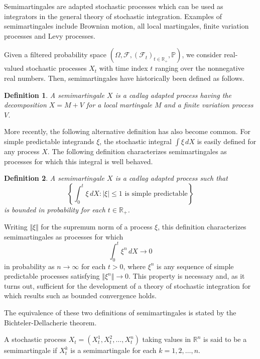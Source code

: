 \documentclass[12pt]{article}
\newtheorem*{definition*}{Definition}
\begin{document}
Semimartingales are adapted stochastic processes which can be used as integrators in the general theory of stochastic integration. Examples of semimartingales include Brownian motion, all local martingales, finite variation processes and Levy processes.

Given a filtered probability space $(\Omega,\mathcal{F},(\mathcal{F}_t)_{t\in\mathbb{R}_+},\mathbb{P})$, we consider real-valued stochastic processes $X_t$ with time index $t$ ranging over the nonnegative real numbers.
Then, semimartingales have historically been defined as follows.

\begin{definition*}
A semimartingale $X$ is a cadlag adapted process having the decomposition $X=M+V$ for a local martingale $M$ and a finite variation process $V$.
\end{definition*}

More recently, the following alternative definition has also become common.
For simple predictable integrands $\xi$, the stochastic integral $\int\xi\,dX$ is easily defined for any process $X$. The following definition characterizes semimartingales as processes for which this integral is well behaved.

\begin{definition*}
A semimartingale $X$ is a cadlag adapted process such that
\begin{equation*}
\left\{\int_0^t\xi\,dX:|\xi|\le 1\textrm{ is simple predictable}\right\}
\end{equation*}
is bounded in probability for each $t\in\mathbb{R}_+$.
\end{definition*}

Writing $\Vert\xi\Vert$ for the supremum norm of a process $\xi$, this definition characterizes semimartingales as processes for which
\begin{equation*}
\int_0^t\xi^n\,dX\rightarrow 0
\end{equation*}
in probability as $n\rightarrow\infty$ for each $t>0$, where $\xi^n$ is any sequence of simple predictable processes satisfying $\Vert\xi^n\Vert\rightarrow 0$. This property is necessary and, as it turns out, sufficient for the development of a theory of stochastic integration for which results such as bounded convergence holds.

The equivalence of these two definitions of semimartingales is stated by the Bichteler-Dellacherie theorem.

A stochastic process $X_t=(X^1_t,X^2_t,\ldots,X^n_t)$ taking values in $\mathbb{R}^n$ is said to be a semimartingale if $X^k_t$ is a semimartingale for each $k=1,2,\ldots,n$.

\end{document}
